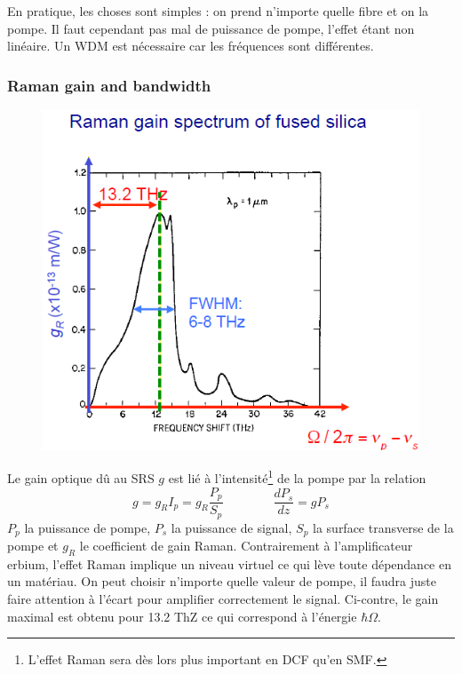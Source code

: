 En pratique, les choses sont simples : on prend n'importe quelle fibre et on la pompe. Il faut cependant pas
mal de puissance de pompe, l'effet étant non linéaire. Un WDM est nécessaire car les fréquences sont différentes.


\subsubsection{Raman gain and bandwidth}
	\begin{figure}
	\vspace{-10mm}
	\includegraphics[scale=0.55]{ch6/image20}
	\end{figure}
Le gain optique dû au SRS $g$ est lié à l'intensité\footnote{L'effet Raman sera dès lors plus important en 
DCF qu'en SMF.} de la pompe par la relation
\begin{equation}
g = {g_R}{I_p} = {g_R}\frac{{{P_p}}}{{{S_p}}}\qquad\qquad  \frac{{d{P_s}}}{{dz}} = g{P_s}
\end{equation}
$P_p$ la puissance de pompe, $P_s$ la puissance de signal, $S_p$ la surface transverse de la pompe et 
$g_R$ le coefficient de gain Raman. Contrairement à l'amplificateur erbium, l'effet Raman implique un 
niveau virtuel ce qui lève toute dépendance en un matériau. On peut choisir n'importe quelle valeur de pompe, 
il faudra juste faire attention à l'écart pour amplifier correctement le signal. Ci-contre, le gain maximal
est obtenu pour 13.2 ThZ ce qui correspond à l'énergie $\hbar\Omega$.

